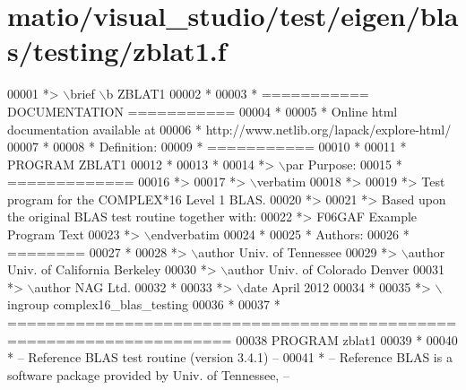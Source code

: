 \hypertarget{matio_2visual__studio_2test_2eigen_2blas_2testing_2zblat1_8f_source}{}\section{matio/visual\+\_\+studio/test/eigen/blas/testing/zblat1.f}
\label{matio_2visual__studio_2test_2eigen_2blas_2testing_2zblat1_8f_source}

\begin{DoxyCode}
00001 \textcolor{comment}{*> \(\backslash\)brief \(\backslash\)b ZBLAT1}
00002 \textcolor{comment}{*}
00003 \textcolor{comment}{*  =========== DOCUMENTATION ===========}
00004 \textcolor{comment}{*}
00005 \textcolor{comment}{* Online html documentation available at }
00006 \textcolor{comment}{*            http://www.netlib.org/lapack/explore-html/ }
00007 \textcolor{comment}{*}
00008 \textcolor{comment}{*  Definition:}
00009 \textcolor{comment}{*  ===========}
00010 \textcolor{comment}{*}
00011 \textcolor{comment}{*       PROGRAM ZBLAT1}
00012 \textcolor{comment}{* }
00013 \textcolor{comment}{*}
00014 \textcolor{comment}{*> \(\backslash\)par Purpose:}
00015 \textcolor{comment}{*  =============}
00016 \textcolor{comment}{*>}
00017 \textcolor{comment}{*> \(\backslash\)verbatim}
00018 \textcolor{comment}{*>}
00019 \textcolor{comment}{*>    Test program for the COMPLEX*16 Level 1 BLAS.}
00020 \textcolor{comment}{*>}
00021 \textcolor{comment}{*>    Based upon the original BLAS test routine together with:}
00022 \textcolor{comment}{*>    F06GAF Example Program Text}
00023 \textcolor{comment}{*> \(\backslash\)endverbatim}
00024 \textcolor{comment}{*}
00025 \textcolor{comment}{*  Authors:}
00026 \textcolor{comment}{*  ========}
00027 \textcolor{comment}{*}
00028 \textcolor{comment}{*> \(\backslash\)author Univ. of Tennessee }
00029 \textcolor{comment}{*> \(\backslash\)author Univ. of California Berkeley }
00030 \textcolor{comment}{*> \(\backslash\)author Univ. of Colorado Denver }
00031 \textcolor{comment}{*> \(\backslash\)author NAG Ltd. }
00032 \textcolor{comment}{*}
00033 \textcolor{comment}{*> \(\backslash\)date April 2012}
00034 \textcolor{comment}{*}
00035 \textcolor{comment}{*> \(\backslash\)ingroup complex16\_blas\_testing}
00036 \textcolor{comment}{*}
00037 \textcolor{comment}{*  =====================================================================}
00038       \textcolor{keyword}{PROGRAM} zblat1
00039 \textcolor{comment}{*}
00040 \textcolor{comment}{*  -- Reference BLAS test routine (version 3.4.1) --}
00041 \textcolor{comment}{*  -- Reference BLAS is a software package provided by Univ. of Tennessee,    --}

\end{DoxyCode}
